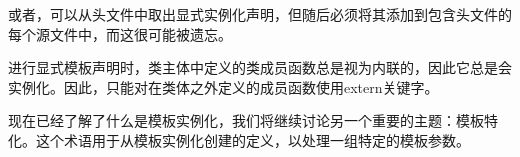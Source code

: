 或者，可以从头文件中取出显式实例化声明，但随后必须将其添加到包含头文件的每个源文件中，而这很可能被遗忘。

进行显式模板声明时，类主体中定义的类成员函数总是视为内联的，因此它总是会实例化。因此，只能对在类体之外定义的成员函数使用extern关键字。

现在已经了解了什么是模板实例化，我们将继续讨论另一个重要的主题：模板特化。这个术语用于从模板实例化创建的定义，以处理一组特定的模板参数。
















